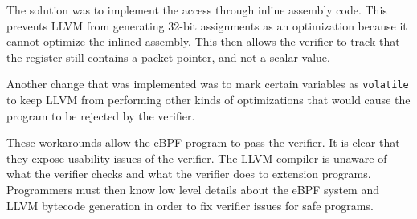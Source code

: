 


The solution was to implement the access through inline assembly code. %
This prevents LLVM from generating 32-bit assignments as an optimization because it cannot optimize the
    inlined assembly.
This then allows the verifier to track that the register still contains a packet pointer, and not a scalar value.

Another change that was implemented was to mark certain variables as \texttt{volatile}
to keep LLVM from performing other kinds of optimizations that would cause the program to be rejected by the verifier.

These workarounds allow the eBPF program to pass the verifier.
It is clear that they expose usability issues of the verifier.
The LLVM compiler is unaware of what the verifier checks and what the verifier does to extension programs.
Programmers must then know low level details about the eBPF system and LLVM bytecode generation in order to fix verifier issues for safe programs.


%    

%    


